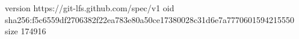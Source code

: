 version https://git-lfs.github.com/spec/v1
oid sha256:f5c6559df2706382f22ea783e80a50ce17380028c31d6e7a7770601594215550
size 174916

